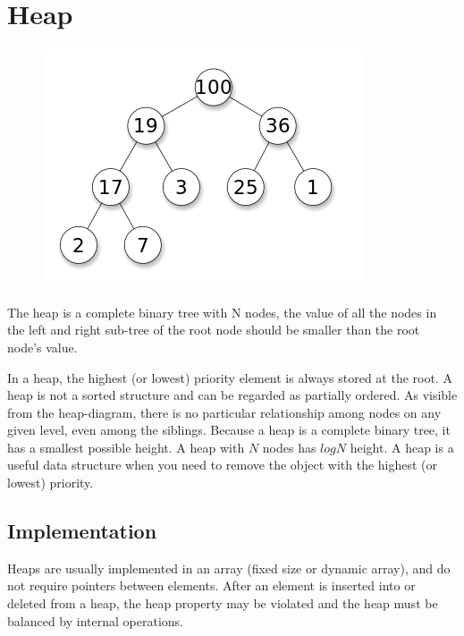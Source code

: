 \documentclass[12pt]{article}
\begin{document}
\section{Heap}

    \begin{figure}
      \centering
      \includegraphics[width=\linewidth/2]{360px-Max-Heap.png}
    \end{figure}
     The heap is a complete binary tree with N nodes, the value of all the nodes in the left and right sub-tree of the root node should be smaller than the root node's value. 
     
     In a heap, the highest (or lowest) priority element is always stored at the root. A heap is not a sorted structure and can be regarded as partially ordered. As visible from the heap-diagram, there is no particular relationship among nodes on any given level, even among the siblings. Because a heap is a complete binary tree, it has a smallest possible height. A heap with $N$ nodes has $logN$ height. A heap is a useful data structure when you need to remove the object with the highest (or lowest) priority. \cite{6,7}
     
     \subsection{Implementation}
     Heaps are usually implemented in an array (fixed size or dynamic array), and do not require pointers between elements. After an element is inserted into or deleted from a heap, the heap property may be violated and the heap must be balanced by internal operations.
     
\end{document}
